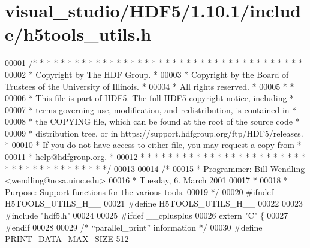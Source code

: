 \hypertarget{visual__studio_2_h_d_f5_21_810_81_2include_2h5tools__utils_8h_source}{}\section{visual\+\_\+studio/\+H\+D\+F5/1.10.1/include/h5tools\+\_\+utils.h}
\label{visual__studio_2_h_d_f5_21_810_81_2include_2h5tools__utils_8h_source}

\begin{DoxyCode}
00001 \textcolor{comment}{/* * * * * * * * * * * * * * * * * * * * * * * * * * * * * * * * * * * * * * *}
00002 \textcolor{comment}{ * Copyright by The HDF Group.                                               *}
00003 \textcolor{comment}{ * Copyright by the Board of Trustees of the University of Illinois.         *}
00004 \textcolor{comment}{ * All rights reserved.                                                      *}
00005 \textcolor{comment}{ *                                                                           *}
00006 \textcolor{comment}{ * This file is part of HDF5.  The full HDF5 copyright notice, including     *}
00007 \textcolor{comment}{ * terms governing use, modification, and redistribution, is contained in    *}
00008 \textcolor{comment}{ * the COPYING file, which can be found at the root of the source code       *}
00009 \textcolor{comment}{ * distribution tree, or in https://support.hdfgroup.org/ftp/HDF5/releases.  *}
00010 \textcolor{comment}{ * If you do not have access to either file, you may request a copy from     *}
00011 \textcolor{comment}{ * help@hdfgroup.org.                                                        *}
00012 \textcolor{comment}{ * * * * * * * * * * * * * * * * * * * * * * * * * * * * * * * * * * * * * * */}
00013 
00014 \textcolor{comment}{/*}
00015 \textcolor{comment}{ * Programmer:  Bill Wendling <wendling@ncsa.uiuc.edu>}
00016 \textcolor{comment}{ *              Tuesday, 6. March 2001}
00017 \textcolor{comment}{ *}
00018 \textcolor{comment}{ * Purpose:     Support functions for the various tools.}
00019 \textcolor{comment}{ */}
00020 \textcolor{preprocessor}{#ifndef H5TOOLS\_UTILS\_H\_\_}
00021 \textcolor{preprocessor}{#define H5TOOLS\_UTILS\_H\_\_}
00022 
00023 \textcolor{preprocessor}{#include "hdf5.h"}
00024 
00025 \textcolor{preprocessor}{#ifdef \_\_cplusplus}
00026 \textcolor{keyword}{extern} \textcolor{stringliteral}{"C"} \{
00027 \textcolor{preprocessor}{#endif}
00028 
00029 \textcolor{comment}{/* ``parallel\_print'' information */}
00030 \textcolor{preprocessor}{#define PRINT\_DATA\_MAX\_SIZE     512}

\end{DoxyCode}
